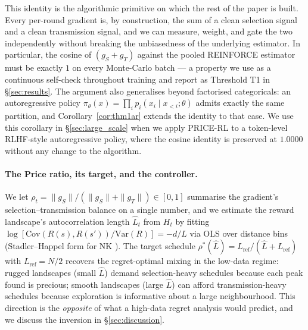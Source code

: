 This identity is the algorithmic primitive on which the rest of the paper is built. Every per-round gradient is, by construction, the sum of a clean selection signal and a clean transmission signal, and we can measure, weight, and gate the two independently without breaking the unbiasedness of the underlying estimator. In particular, the cosine of $(g_S + g_T)$ against the pooled REINFORCE estimator must be exactly $1$ on every Monte-Carlo batch --- a property we use as a continuous self-check throughout training and report as Threshold T1 in §\ref{sec:results}. The argument also generalises beyond factorised categoricals: an autoregressive policy $\pi_\theta(x) = \prod_i p_i(x_i \mid x_{<i};\theta)$ admits exactly the same partition, and Corollary~\ref{cor:thm1ar} extends the identity to that case. We use this corollary in §\ref{sec:large_scale} when we apply PRICE-RL to a token-level RLHF-style autoregressive policy, where the cosine identity is preserved at $1.0000$ without any change to the algorithm.

\paragraph{The Price ratio, its target, and the controller.} We let $\rho_t = \|g_S\| / (\|g_S\| + \|g_T\|) \in [0,1]$ summarise the gradient's selection--transmission balance on a single number, and we estimate the reward landscape's autocorrelation length $\hat L_t$ from $H_t$ by fitting $\log[\mathrm{Cov}(R(s),R(s'))/\mathrm{Var}(R)] = -d/L$ via OLS over distance bins (Stadler--Happel form for NK \citep{stadler1999random}). The target schedule
\(
\rho^*(\hat L) = L_{\mathrm{ref}}/(\hat L + L_{\mathrm{ref}})
\)
with $L_{\mathrm{ref}} = N/2$ recovers the regret-optimal mixing in the low-data regime: rugged landscapes (small $\hat L$) demand selection-heavy schedules because each peak found is precious; smooth landscapes (large $\hat L$) can afford transmission-heavy schedules because exploration is informative about a large neighbourhood. This direction is the \emph{opposite} of what a high-data regret analysis would predict, and we discuss the inversion in §\ref{sec:discussion}.

